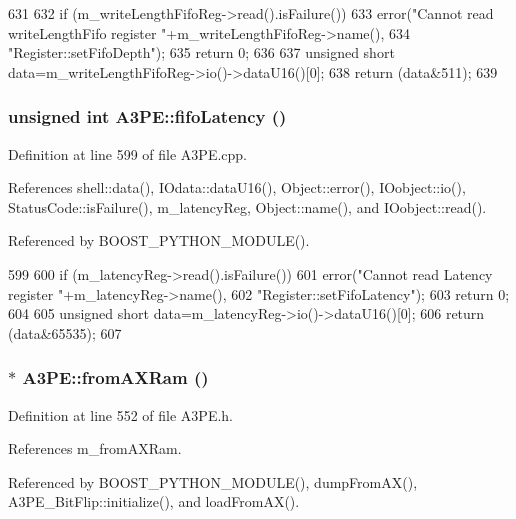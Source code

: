 \begin{DoxyCode}
631                             {
632   if (m_writeLengthFifoReg->read().isFailure()){
633     error("Cannot read writeLengthFifo register "+m_writeLengthFifoReg->name(),
634         "Register::setFifoDepth");
635     return 0;
636   }
637   unsigned short data=m_writeLengthFifoReg->io()->dataU16()[0];
638   return (data&511);   
639 }
\end{DoxyCode}
\hypertarget{classA3PE_a7f6959a6a38c16fa6609560827413764}{
\subsubsection[{fifoLatency}]{\setlength{\rightskip}{0pt plus 5cm}unsigned int A3PE::fifoLatency ()}}
\label{classA3PE_a7f6959a6a38c16fa6609560827413764}


Definition at line 599 of file A3PE.cpp.

References shell::data(), IOdata::dataU16(), Object::error(), IOobject::io(), StatusCode::isFailure(), m\_\-latencyReg, Object::name(), and IOobject::read().

Referenced by BOOST\_\-PYTHON\_\-MODULE().


\begin{DoxyCode}
599                               {
600   if (m_latencyReg->read().isFailure()){
601     error("Cannot read Latency register "+m_latencyReg->name(),
602         "Register::setFifoLatency");
603     return 0;
604   }
605   unsigned short data=m_latencyReg->io()->dataU16()[0];
606   return (data&65535);   
607 }
\end{DoxyCode}
\hypertarget{classA3PE_a7c9026a74c1954b2d250be05fbc1c8c5}{
\subsubsection[{fromAXRam}]{$\ast$ A3PE::fromAXRam ()}}
\label{classA3PE_a7c9026a74c1954b2d250be05fbc1c8c5}


Definition at line 552 of file A3PE.h.

References m\_\-fromAXRam.

Referenced by BOOST\_\-PYTHON\_\-MODULE(), dumpFromAX(), A3PE\_\-BitFlip::initialize(), and loadFromAX().


